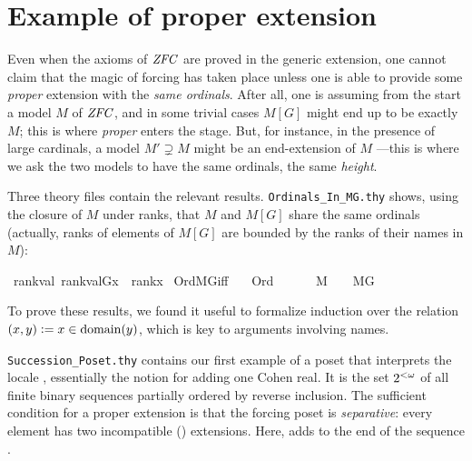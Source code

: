 \section{Example of proper extension}
\label{sec:example-proper-extension}

Even when the axioms of $\mathit{ZFC}$ are proved in the generic extension,
one cannot claim that the magic of forcing has taken place unless one
is able to provide some \emph{proper} extension with the \emph{same
ordinals}. After all, one is assuming from the start a model $M$ of $\mathit{ZFC}$,
and in some trivial cases $M[G]$ might end up to be exactly $M$; this
is where \emph{proper} enters the stage. But, for instance, in the
presence of large cardinals, a model $M'\supsetneq M$ might be an
end-extension of $M$ ---this is where we ask the two models to have the
same ordinals, the same \emph{height}. 

Three theory files contain the relevant
results. \verb|Ordinals_In_MG.thy| shows, using the closure of $M$
under ranks, that $M$ and $M[G]$ share the same ordinals (actually,
ranks of elements of $M[G]$ are bounded by the ranks of their names in
$M$):
\begin{isabelle}
\isamarkupfalse%
\ rank{\isacharunderscore}val{\isacharcolon}\ {\isachardoublequoteopen}rank{\isacharparenleft}val{\isacharparenleft}G{\isacharcomma}x{\isacharparenright}{\isacharparenright}\ {\isasymle}\ rank{\isacharparenleft}x{\isacharparenright}{\isachardoublequoteclose}\isanewline
{}\isamarkupfalse%
\ Ord{\isacharunderscore}MG{\isacharunderscore}iff{\isacharcolon}\isanewline
\ \ \ {\isachardoublequoteopen}Ord{\isacharparenleft}{\isasymalpha}{\isacharparenright}{\isachardoublequoteclose}\ \isanewline
\ \ \ {\isachardoublequoteopen}{\isasymalpha}\ {\isasymin}\ M\ {\isasymlongleftrightarrow}\ {\isasymalpha}\ {\isasymin}\ M{\isacharbrackleft}G{\isacharbrackright}{\isachardoublequoteclose}
\end{isabelle}
To prove these results, we found it useful to formalize induction over
the relation $(x,y) \mathrel{\mathop:}= x\in\operatorname{domain}(y)$, which is key
to arguments involving names.

\verb|Succession_Poset.thy| contains our first example of a poset
that interprets the locale
, essentially the notion for
adding one Cohen real. It is the set $2^{<\omega}$ of all finite binary
sequences partially  ordered by reverse inclusion.
The sufficient condition for a proper extension is that
the forcing poset is \emph{separative}: every element has two
incompatible () extensions. Here,
adds  to the end of the sequence .

